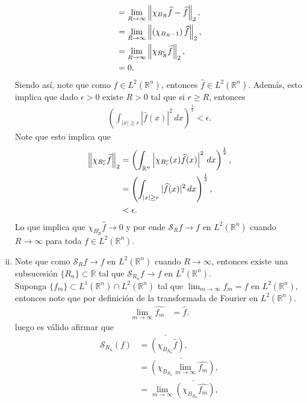 \begin{homeworkProblem}
\begin{solution}
\begin{enumerate}[(i)]
\begin{align*}
          &=\lim_{R \to \infty}\left\|\chi_{B_{R}}\widehat{f}-\widehat{f}\right\|_{2},\\
          &=\lim_{R \to \infty}\left\|\left( \chi_{B_{R}-1} \right)\widehat{f}\right\|_{2},\\
          &=\lim_{R \to \infty}\left\|\chi_{B_{R}^{c}}\widehat{f}\right\|_{2},\\
          &=0.
        \end{align*}
        Siendo así, note que como $f\in L^2(\mathbb{R}^{n})$, entonces $\hat{f}\in L^2(\mathbb{R}^{n})$. Además, esto implica que dado $\epsilon>0$ existe $R>0$ tal que si $r\geq R$, entonces
        \begin{align*}
          \left(\int_{|x|\geq r}|\hat{f}(x)|^2\, dx\right)^{\frac{1}{2}} <\epsilon.
        \end{align*}
        Note que esto implica que
        \begin{align*}
          \left\|\chi_{B_{r}^c}\widehat{f}\right\|_{2}&=\left(\int_{\mathbb{R}^{n}}\left|\chi_{B_{r}^c}(x)\widehat{f}(x)\right|^2\, dx\right)^{\frac{1}{2}},\\
          &=\left(\int_{|x|\geq r}|\widehat{f}(x)|^2\, dx\right)^{\frac{1}{2}},\\
          &< \epsilon.
        \end{align*}
        Lo que implica que $\chi_{B_{R}^{c}}\hat{f}\to 0$ y por ende $\mathcal{S}_{R}f\to f$ en $L^2(\mathbb{R}^{n})$ cuando $R\to\infty$ para toda $f\in L^2(\mathbb{R}^{n})$.
      \item Note que como $\mathcal{S}_{R}f\to f$ en $L^2(\mathbb{R}^{n})$ cuando $R\to \infty$, entonces existe una subsucesión $\{R_n\}\subset \mathbb{R}$ tal que $\mathcal{S}_{R_{n}}f\to f$ en $L^2(\mathbb{R}^{n})$.\\
      Suponga $\{f_{m}\}\subset L^{1}(\mathbb{R}^{n})\cap L^2(\mathbb{R}^{n})$ tal que $\lim_{m \to \infty}f_m=f$ en $L^2(\mathbb{R}^{n})$, entonces note que por definición de la transformada de Fourier en $L^2(\mathbb{R}^{n})$.
      \begin{align*}
        \lim_{m \to \infty}\hat{f_{m}}&=\hat{f}.
      \end{align*}
      luego es válido afirmar que
      \begin{align*}
        \mathcal{S}_{R_n}(f)&=\check{\left( \chi_{B_{R_{n}}}\hat{f} \right)},\\
        &=\check{\left( \chi_{B_{R_n}}\lim_{m \to \infty}\hat{f_{m}} \right)},\\
        &=\lim_{m \to \infty}\check{\left( \chi_{B_{R_n}}\hat{f_{m}} \right)},\\

\end{align*}
\end{enumerate}
\end{solution}
\end{homeworkProblem}
